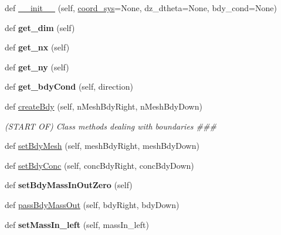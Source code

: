 \begin{DoxyCompactItemize}
\item 
def \hyperlink{classcomp_1_1Comp_a041986f019d03d7fc7d2d7a400d92966}{\+\_\+\+\_\+init\+\_\+\+\_\+} (self, \hyperlink{classcomp_1_1Comp_ae00e132d485d50acaf13977284fd9051}{coord\+\_\+sys}=None, dz\+\_\+dtheta=None, bdy\+\_\+cond=None)
\item 
def {\bfseries get\+\_\+dim} (self)\hypertarget{classcomp_1_1Comp_a194c4491ee3b385837577d7c13ec78a9}{}\label{classcomp_1_1Comp_a194c4491ee3b385837577d7c13ec78a9}

\item 
def {\bfseries get\+\_\+nx} (self)\hypertarget{classcomp_1_1Comp_a4bc59e92071b7ca507e44d53433a4bf7}{}\label{classcomp_1_1Comp_a4bc59e92071b7ca507e44d53433a4bf7}

\item 
def {\bfseries get\+\_\+ny} (self)\hypertarget{classcomp_1_1Comp_aa9754974a57bbe51a9ed46a0205ae505}{}\label{classcomp_1_1Comp_aa9754974a57bbe51a9ed46a0205ae505}

\item 
def {\bfseries get\+\_\+bdy\+Cond} (self, direction)\hypertarget{classcomp_1_1Comp_a32251f4a77a6fe555508981111c6b451}{}\label{classcomp_1_1Comp_a32251f4a77a6fe555508981111c6b451}

\item 
def \hyperlink{classcomp_1_1Comp_af89f05ea9ea53f88ecfa59a503827d23}{create\+Bdy} (self, n\+Mesh\+Bdy\+Right, n\+Mesh\+Bdy\+Down)
\begin{DoxyCompactList}\small\item\em (S\+T\+A\+RT OF) Class methods dealing with boundaries \#\#\# \end{DoxyCompactList}\item 
def \hyperlink{classcomp_1_1Comp_a35ef9e925796bb10640cfe40d5f82c4b}{set\+Bdy\+Mesh} (self, mesh\+Bdy\+Right, mesh\+Bdy\+Down)
\item 
def \hyperlink{classcomp_1_1Comp_a9515ffba9a1e5a0de8542cb736e8ece4}{set\+Bdy\+Conc} (self, conc\+Bdy\+Right, conc\+Bdy\+Down)
\item 
def {\bfseries set\+Bdy\+Mass\+In\+Out\+Zero} (self)\hypertarget{classcomp_1_1Comp_a3811398d197bce2ff384b4f3610eeb0a}{}\label{classcomp_1_1Comp_a3811398d197bce2ff384b4f3610eeb0a}

\item 
def \hyperlink{classcomp_1_1Comp_a4079436132c3be952506f2652a700baa}{pass\+Bdy\+Mass\+Out} (self, bdy\+Right, bdy\+Down)
\item 
def {\bfseries set\+Mass\+In\+\_\+left} (self, mass\+In\+\_\+left)\hypertarget{classcomp_1_1Comp_a86835c18bf9c9b7ce67d0362fc2bd165}{}\label{classcomp_1_1Comp_a86835c18bf9c9b7ce67d0362fc2bd165}


\end{DoxyCompactItemize}
